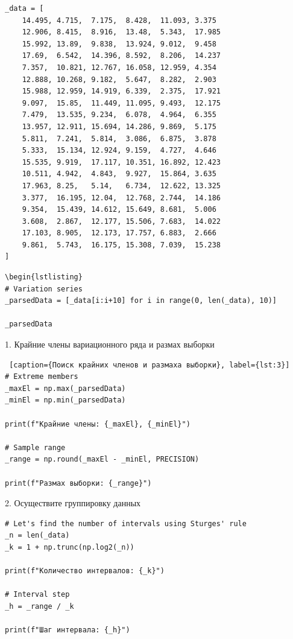 \documentclass[a4paper, 14pt]{extarticle}
\begin{document}
\begin{lstlisting}[caption={Ввод данных}, label={lst:2}]
_data = [
    14.495, 4.715,  7.175,  8.428,  11.093, 3.375
    12.906, 8.415,  8.916,  13.48,  5.343,  17.985
    15.992, 13.89,  9.838,  13.924, 9.012,  9.458
    17.69,  6.542,  14.396, 8.592,  8.206,  14.237
    7.357,  10.821, 12.767, 16.058, 12.959, 4.354
    12.888, 10.268, 9.182,  5.647,  8.282,  2.903
    15.988, 12.959, 14.919, 6.339,  2.375,  17.921
    9.097,  15.85,  11.449, 11.095, 9.493,  12.175
    7.479,  13.535, 9.234,  6.078,  4.964,  6.355
    13.957, 12.911, 15.694, 14.286, 9.869,  5.175
    5.811,  7.241,  5.814,  3.086,  6.875,  3.878
    5.333,  15.134, 12.924, 9.159,  4.727,  4.646
    15.535, 9.919,  17.117, 10.351, 16.892, 12.423
    10.511, 4.942,  4.843,  9.927,  15.864, 3.635
    17.963, 8.25,   5.14,   6.734,  12.622, 13.325
    3.377,  16.195, 12.04,  12.768, 2.744,  14.186
    9.354,  15.439, 14.612, 15.649, 8.681,  5.006
    3.608,  2.867,  12.177, 15.506, 7.683,  14.022
    17.103, 8.905,  12.173, 17.757, 6.883,  2.666
    9.861,  5.743,  16.175, 15.308, 7.039,  15.238
]
\end{lstlisting}

\begin{lstlisting}
\begin{lstlisting}
# Variation series
_parsedData = [_data[i:i+10] for i in range(0, len(_data), 10)] 

_parsedData
\end{lstlisting}

\begin{center}
    1. Крайние члены вариационного ряда и размах выборки
\end{center}

\begin{lstlisting} [caption={Поиск крайних членов и размаха выборки}, label={lst:3}]
# Extreme members
_maxEl = np.max(_parsedData)
_minEl = np.min(_parsedData)

print(f"Крайние члены: {_maxEl}, {_minEl}")

# Sample range
_range = np.round(_maxEl - _minEl, PRECISION)

print(f"Размах выборки: {_range}")
\end{lstlisting}

\begin{center}
    2. Осуществите группировку данных
\end{center}

\begin{lstlisting}[caption={Поиск интервалов}, label={lst:4}]
# Let's find the number of intervals using Sturges' rule
_n = len(_data)
_k = 1 + np.trunc(np.log2(_n))

print(f"Количество интервалов: {_k}")

# Interval step
_h = _range / _k

print(f"Шаг интервала: {_h}")
\end{lstlisting}
\end{document}
